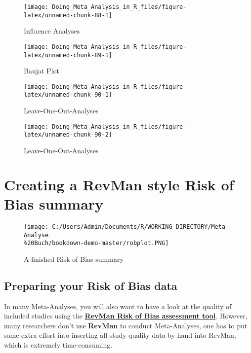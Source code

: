 \documentclass[]{book}
\theoremstyle{definition}
\theoremstyle{definition}
\theoremstyle{definition}
\theoremstyle{remark}
\begin{document}
\begin{figure}

{\centering \texttt{[image: Doing\_Meta\_Analysis\_in\_R\_files/figure-latex/unnamed-chunk-88-1]} 

}

\caption{Influence Analyses}\label{fig:unnamed-chunk-88}
\end{figure}\begin{figure}

{\centering \texttt{[image: Doing\_Meta\_Analysis\_in\_R\_files/figure-latex/unnamed-chunk-89-1]} 

}

\caption{Baujat Plot}\label{fig:unnamed-chunk-89}
\end{figure}

\begin{figure}

{\centering \texttt{[image: Doing\_Meta\_Analysis\_in\_R\_files/figure-latex/unnamed-chunk-90-1]} 

}

\caption{Leave-One-Out-Analyses}\label{fig:unnamed-chunk-901}
\end{figure}\begin{figure}

{\centering \texttt{[image: Doing\_Meta\_Analysis\_in\_R\_files/figure-latex/unnamed-chunk-90-2]} 

}

\caption{Leave-One-Out-Analyses}\label{fig:unnamed-chunk-902}
\end{figure}

\chapter{Creating a RevMan style Risk of Bias
summary}\label{creating-a-revman-style-risk-of-bias-summary}

\begin{figure}
\centering
\texttt{[image: C:/Users/Admin/Documents/R/WORKING\_DIRECTORY/Meta-Analyse\\\%20Buch/bookdown-demo-master/robplot.PNG]}
\caption{A finished Risk of Bias summary}
\end{figure}

\section{Preparing your Risk of Bias
data}\label{preparing-your-risk-of-bias-data}

In many Meta-Analyses, you will also want to have a look at the quality
of included studies using the
\href{https://handbook-5-1.cochrane.org/chapter_8/8_6_presentation_of_assessments_of_risk_of_bias.htm}{\textbf{RevMan
Risk of Bias assessment tool}}. However, many researchers don't use
\textbf{RevMan} to conduct Meta-Analyses, one has to put some extra
effort into inserting all study quality data by hand into RevMan, which
is extremely time-consuming.
\end{document}
